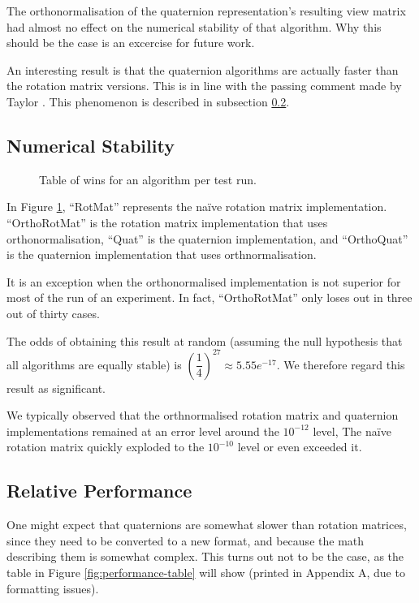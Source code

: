 \documentclass{acm_proc_article-sp}
\begin{document}
The orthonormalisation of the quaternion representation's resulting view matrix had almost no effect on the numerical stability of that algorithm.
Why this should be the case is an excercise for future work.

An interesting result is that the quaternion algorithms are actually faster than the rotation matrix versions.
This is in line with the passing comment made by Taylor \cite{taylor79}.
This phenomenon is described in subsection \ref{sec:performance}.

\subsection{Numerical Stability}
\label{sec:stability}

\begin{figure}
\caption{Table of wins for an algorithm per test run.}
\label{fig:wins}
\end{figure}

In Figure \ref{fig:wins}, ``RotMat'' represents the na\"{i}ve rotation matrix implementation. ``OrthoRotMat'' is the rotation matrix implementation that uses orthonormalisation, ``Quat'' is the quaternion implementation, and ``OrthoQuat'' is the quaternion implementation that uses orthnormalisation.

It is an exception when the orthonormalised implementation is not superior for most of the run of an experiment.
In fact, ``OrthoRotMat'' only loses out in three out of thirty cases.

The odds of obtaining this result at random (assuming the null hypothesis that all algorithms are equally stable) is $\left(\dfrac{1}{4}\right)^{27} \approx 5.55e^{-17}$.
We therefore regard this result as significant.

We typically observed that the orthnormalised rotation matrix and quaternion implementations remained at an error level around the $10^{-12}$ level,
The na\"{i}ve rotation matrix quickly exploded to the $10^{-10}$ level or even exceeded it.

\subsection{Relative Performance}
\label{sec:performance}

One might expect that quaternions are somewhat slower than rotation matrices, since they need to be converted to a new format, and because the math describing them is somewhat complex.
This turns out not to be the case, as the table in Figure \ref{fig:performance-table} will show (printed in Appendix A, due to formatting issues).
\end{document}
